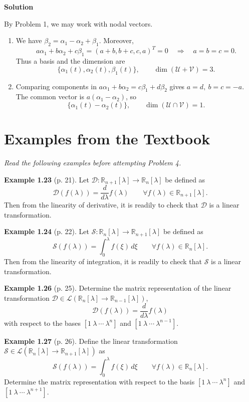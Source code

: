 \documentclass[UTF8,10pt,letterpaper,fontset=fandol]{ctexart}
\newcommand{\R}{\mathbb R}
\newcommand{\Solution}{\par\Needspace{5\baselineskip}\textbf{Solution}\par}
\begin{document}
\Solution
By Problem 1, we may work with nodal vectors.
\begin{enumerate}
\item We have \(\beta_2=\alpha_1-\alpha_2+\beta_1\). Moreover,
\[
a\alpha_1+b\alpha_2+c\beta_1
=(a+b,b+c,c,a)^T=0\quad\Longrightarrow\quad a=b=c=0.
\]
Thus a basis and the dimension are
\[
\boxed{\{\alpha_1(t),\alpha_2(t),\beta_1(t)\}},\qquad
\boxed{\dim(\mathcal U+\mathcal V)=3}.
\]
\item Comparing components in \(a\alpha_1+b\alpha_2=c\beta_1+d\beta_2\)
gives \(a=d,\ b=c=-a\). The common vector is \(a(\alpha_1-\alpha_2)\), so
\[
\boxed{\{\alpha_1(t)-\alpha_2(t)\}},\qquad
\boxed{\dim(\mathcal U\cap\mathcal V)=1}.
\]
\end{enumerate}

\section{Examples from the Textbook}
\emph{Read the following examples before attempting Problem 4.}

\textbf{Example 1.23} (p. 21).
Let \(\mathcal D:\R_{n+1}[\lambda]\to\R_n[\lambda]\) be defined as
\[
\mathcal D(f(\lambda))=\frac{d}{d\lambda}f(\lambda)
\qquad\forall f(\lambda)\in\R_{n+1}[\lambda].
\]
Then from the linearity of derivative, it is readily to check that
\(\mathcal D\) is a linear transformation.

\textbf{Example 1.24} (p. 22).
Let \(\mathcal S:\R_n[\lambda]\to\R_{n+1}[\lambda]\) be defined as
\[
\mathcal S(f(\lambda))=\int_0^\lambda f(\xi)\,d\xi
\qquad\forall f(\lambda)\in\R_n[\lambda].
\]
Then from the linearity of integration, it is readily to check that
\(\mathcal S\) is a linear transformation.

\begin{samepage}
\textbf{Example 1.26} (p. 25).
Determine the matrix representation of the linear transformation
\(\mathcal D\in\mathcal L(\R_n[\lambda]\to\R_{n-1}[\lambda])\),
\[
\mathcal D(f(\lambda))=\frac{d}{d\lambda}f(\lambda)
\]
with respect to the bases \([1\ \lambda\ \cdots\ \lambda^n]\) and
\([1\ \lambda\ \cdots\ \lambda^{n-1}]\).
\end{samepage}

\textbf{Example 1.27} (p. 26).
Define the linear transformation
\(\mathcal S\in\mathcal L(\R_n[\lambda]\to\R_{n+1}[\lambda])\) as
\[
\mathcal S(f(\lambda))=\int_0^\lambda f(\xi)\,d\xi
\qquad\forall f(\lambda)\in\R_n[\lambda].
\]
Determine the matrix representation with respect to the basis
\([1\ \lambda\ \cdots\ \lambda^n]\) and \([1\ \lambda\ \cdots\ \lambda^{n+1}]\).
\end{document}

